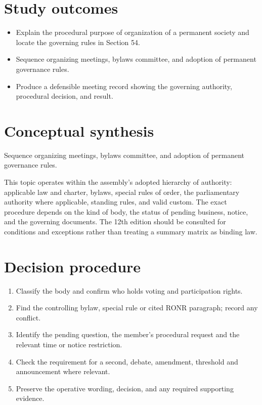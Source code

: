 \documentclass[11pt]{article}
\begin{document}
\SuiteOpen
{}
\section{Study outcomes}
\begin{itemize}[leftmargin=*,itemsep=4pt]
\item Explain the procedural purpose of organization of a permanent society and locate the governing rules in Section 54.
\item Sequence organizing meetings, bylaws committee, and adoption of permanent governance rules.
\item Produce a defensible meeting record showing the governing authority, procedural decision, and result.
\end{itemize}

\section{Conceptual synthesis}
Sequence organizing meetings, bylaws committee, and adoption of permanent governance rules.

This topic operates within the assembly’s adopted hierarchy of authority: applicable law and charter, bylaws, special rules of order, the parliamentary authority where applicable, standing rules, and valid custom. The exact procedure depends on the kind of body, the status of pending business, notice, and the governing documents. The 12th edition should be consulted for conditions and exceptions rather than treating a summary matrix as binding law.
\section{Decision procedure}
\begin{enumerate}[leftmargin=*,itemsep=4pt]
\item Classify the body and confirm who holds voting and participation rights.
\item Find the controlling bylaw, special rule or cited RONR paragraph; record any conflict.
\item Identify the pending question, the member’s procedural request and the relevant time or notice restriction.
\item Check the requirement for a second, debate, amendment, threshold and announcement where relevant.
\item Preserve the operative wording, decision, and any required supporting evidence.
\end{enumerate}
\end{document}
